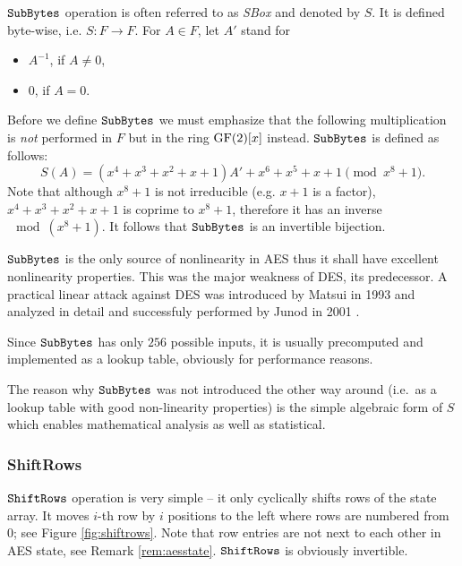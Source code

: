 	$\texttt{SubBytes}$ operation is often referred to as {\em SBox} and denoted by $S$. It is defined byte-wise, i.e. $S: F \rightarrow F$. For $A\in F$, let $A'$ stand for
	\begin{itemize}
		\item $A^{-1}$, if $A \neq 0$,
		\item $0$, if $A = 0$.
	\end{itemize}
	Before we define $\texttt{SubBytes}$ we must emphasize that the following multiplication is {\em not} performed in $F$ but in the ring $\mathrm{GF}(2)[x]$ instead. $\texttt{SubBytes}$ is defined as follows:
	\begin{equation*}
		S(A) = (x^4 + x^3 + x^2 + x + 1)A' + x^6 + x^5 + x + 1 \pmod{x^8+1} .
	\end{equation*}
	Note that although $x^8+1$ is not irreducible (e.g. $x+1$ is a factor), $x^4 + x^3 + x^2 + x + 1$ is coprime to $x^8+1$, therefore it has an inverse$\mod(x^8+1)$. It follows that $\texttt{SubBytes}$ is an invertible bijection.
	
	$\texttt{SubBytes}$ is the only source of nonlinearity in AES thus it shall have excellent nonlinearity properties. This was the major weakness of DES, its predecessor. A practical linear attack against DES was introduced by Matsui in 1993 \cite{matsui1994linear} and analyzed in detail and successfuly performed by Junod in 2001 \cite{junod2001complexity}.
	
	\begin{note}
	\label{note:sboxtable}
		Since $\texttt{SubBytes}$ has only $256$ possible inputs, it is usually precomputed and implemented as a lookup table, obviously for performance reasons.
	\end{note}
	
	The reason why $\texttt{SubBytes}$ was not introduced the other way around (i.e.\ as a lookup table with good non-linearity properties) is the simple algebraic form of $S$ which enables mathematical analysis as well as statistical.   %

\subsubsection{ShiftRows}
	
	$\texttt{ShiftRows}$ operation is very simple -- it only cyclically shifts rows of the state array. It moves $i$-th row by $i$ positions to the left where rows are numbered from $0$; see Figure \ref{fig:shiftrows}. Note that row entries are not next to each other in AES state, see Remark \ref{rem:aesstate}. $\texttt{ShiftRows}$ is obviously invertible.
	
